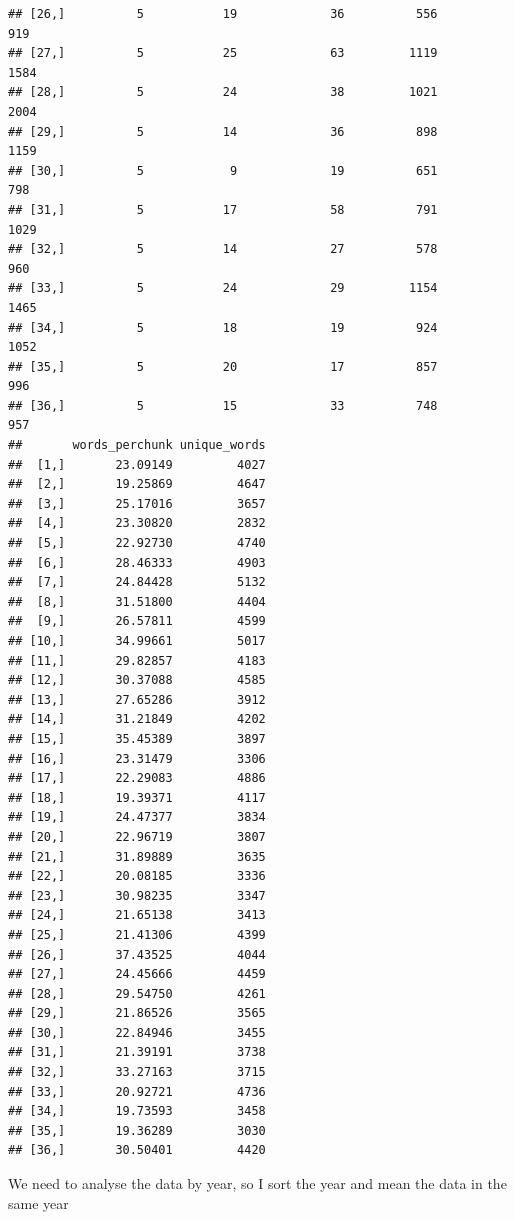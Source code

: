 \documentclass{article}\usepackage[]{graphicx}\usepackage[]{color}
\makeatletter
\newenvironment{kframe}{%
 \def\at@end@of@kframe{}%
 \ifinner\ifhmode%
  \def\at@end@of@kframe{\end{minipage}}%
  \begin{minipage}{\columnwidth}%
 \fi\fi%
 \def\FrameCommand##1{\hskip\@totalleftmargin \hskip-\fboxsep
 \colorbox{shadecolor}{##1}\hskip-\fboxsep
     \hskip-\linewidth \hskip-\@totalleftmargin \hskip\columnwidth}%
 \MakeFramed {\advance\hsize-\width
   \@totalleftmargin\z@ \linewidth\hsize
   \@setminipage}}%
 {\par\unskip\endMakeFramed%
 \at@end@of@kframe}
\newenvironment{knitrout}{}{} %
\makeatother
\begin{document}
\begin{knitrout}
\begin{kframe}
\begin{verbatim}
## [26,]          5           19             36          556              919
## [27,]          5           25             63         1119             1584
## [28,]          5           24             38         1021             2004
## [29,]          5           14             36          898             1159
## [30,]          5            9             19          651              798
## [31,]          5           17             58          791             1029
## [32,]          5           14             27          578              960
## [33,]          5           24             29         1154             1465
## [34,]          5           18             19          924             1052
## [35,]          5           20             17          857              996
## [36,]          5           15             33          748              957
##       words_perchunk unique_words
##  [1,]       23.09149         4027
##  [2,]       19.25869         4647
##  [3,]       25.17016         3657
##  [4,]       23.30820         2832
##  [5,]       22.92730         4740
##  [6,]       28.46333         4903
##  [7,]       24.84428         5132
##  [8,]       31.51800         4404
##  [9,]       26.57811         4599
## [10,]       34.99661         5017
## [11,]       29.82857         4183
## [12,]       30.37088         4585
## [13,]       27.65286         3912
## [14,]       31.21849         4202
## [15,]       35.45389         3897
## [16,]       23.31479         3306
## [17,]       22.29083         4886
## [18,]       19.39371         4117
## [19,]       24.47377         3834
## [20,]       22.96719         3807
## [21,]       31.89889         3635
## [22,]       20.08185         3336
## [23,]       30.98235         3347
## [24,]       21.65138         3413
## [25,]       21.41306         4399
## [26,]       37.43525         4044
## [27,]       24.45666         4459
## [28,]       29.54750         4261
## [29,]       21.86526         3565
## [30,]       22.84946         3455
## [31,]       21.39191         3738
## [32,]       33.27163         3715
## [33,]       20.92721         4736
## [34,]       19.73593         3458
## [35,]       19.36289         3030
## [36,]       30.50401         4420
\end{verbatim}
\end{kframe}
\end{knitrout}
We need to analyse the data by year, so I sort the year and mean the data in the same year
\end{document}
